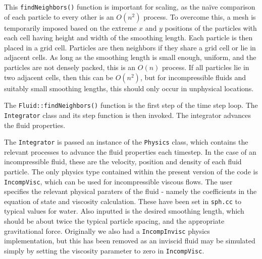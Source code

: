 \documentclass[11pt]{article}
\begin{document}
This \texttt{findNeighbors()} function is important for scaling, as the na\"ive
comparison of each particle to every other is an $O(n^2)$ process. To overcome
this, a mesh is temporarily imposed based on the extreme $x$ and $y$ positions
of the particles with each cell having height and width of the smoothing length.
Each particle is then placed in a grid cell. Particles are then neighbors if 
they share a grid cell or lie in adjacent cells. As long as the smoothing length
is small enough, uniform, and the particles are not densely packed, this is an 
$O(n)$ process. If all particles lie in two adjacent cells, then this can be 
$O(n^2)$, but for incompressible fluids and suitably small smoothing lengths, 
this should only occur in unphysical locations.

The \texttt{Fluid::findNeighbors()} function is the first step of the time step
loop. The \texttt{Integrator} class and its step function is then invoked. The
integrator advances the fluid properties.

The \texttt{Integrator} is passed an instance of the \texttt{Physics} class,
which contains the relevant processes to advance the fluid properties each timestep.
In the case of an incompressible fluid, these are the velocity, position and density of
each fluid particle. 
The only physics type contained within the present version of the code is \texttt{IncompVisc},
which can be used for incompressible viscous flows. The user specifies the relevant physical
paraters of the fluid - namely the coefficients in the equation of state and viscosity calculation. 
These have been set in \texttt{sph.cc} to typical values for water. Also inputted is the desired 
smoothing length, which should be about twice the typical particle spacing, and the appropriate 
gravitational force.  Originally we also had a \texttt{IncompInvisc} physics implementation, but 
this has been removed as an inviscid fluid may be simulated simply by setting the viscosity 
parameter to zero in \texttt{IncompVisc}. 
\end{document}

